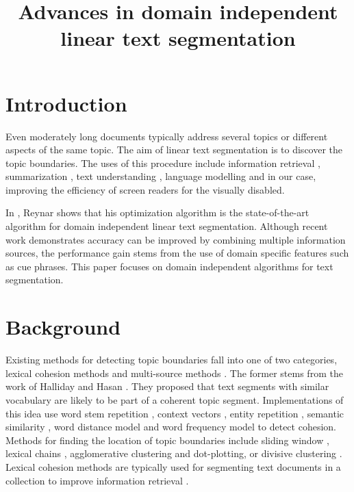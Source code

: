 \documentclass[11pt]{article}
\title{Advances in domain independent linear text segmentation}
\begin{document}
\maketitle

\section{Introduction}
Even moderately long documents typically address several topics or different aspects of the same topic. The aim of linear text segmentation is to discover the topic boundaries. The uses of this procedure include information retrieval \cite{hearst_1994,yaari_1997,reynar_1999}, summarization \cite{reynar_1998}, text understanding \cite{kozima_1993}, language modelling \cite{morris_hirst_1991,beeferman_et_al_1997} and in our case, improving the efficiency of screen readers for the visually disabled.

In \cite{reynar_1998}, Reynar shows that his optimization algorithm is the state-of-the-art algorithm for domain independent linear text segmentation. Although recent work \cite{reynar_1999,beeferman_et_al_1999} demonstrates accuracy can be improved by combining multiple information sources, the performance gain stems from the use of domain specific features such as cue phrases. This paper focuses on domain independent algorithms for text segmentation.

\section{Background}
Existing methods for detecting topic boundaries fall into one of two categories, lexical cohesion methods and multi-source methods \cite{yaari_1997}. The former stems from the work of Halliday and Hasan \cite{halliday_hasan_1976}. They proposed that text segments with similar vocabulary are likely to be part of a coherent topic segment. Implementations of this idea use word stem repetition \cite{reynar_1994,ponte_croft_1997}, context vectors \cite{hearst_1994,yaari_1997,kaufmann_1999,eichmann_et_al_1999}, entity repetition \cite{kan_et_al_1998}, semantic similarity \cite{morris_hirst_1991,kozima_1993}, word distance model \cite{beeferman_et_al_1997b} and word frequency model \cite{reynar_1999} to detect cohesion. Methods for finding the location of topic boundaries include sliding window \cite{hearst_1994}, lexical chains \cite{morris_1988,kan_et_al_1998}, agglomerative clustering \cite{yaari_1997} and dot-plotting, or divisive clustering \cite{reynar_1994}. Lexical cohesion methods are typically used for segmenting text documents in a collection to improve information retrieval \cite{hearst_1994,reynar_1998}.
\end{document}
